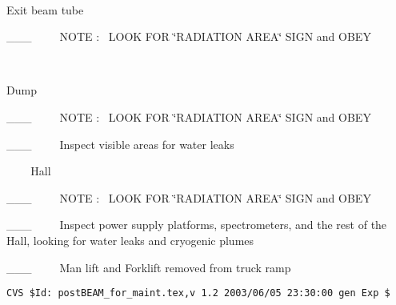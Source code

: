 ~

Exit beam tube

\_\_\_~~~~~NOTE :~ LOOK FOR \char`\"{}RADIATION AREA\char`\"{} SIGN and OBEY

~

Dump

\_\_\_~~~~~NOTE :~ LOOK FOR \char`\"{}RADIATION AREA\char`\"{} SIGN and OBEY

\_\_\_~~~~~Inspect visible areas for water leaks

~
~
~Hall 

\_\_\_~~~~~NOTE :~ LOOK FOR \char`\"{}RADIATION AREA\char`\"{} SIGN and OBEY

\_\_\_~~~~~Inspect power supply platforms, spectrometers, and the rest of the
Hall, looking for water leaks and cryogenic plumes

\_\_\_~~~~~Man lift and Forklift removed from truck ramp
%
%
{\small
\begin{verbatim}CVS $Id: postBEAM_for_maint.tex,v 1.2 2003/06/05 23:30:00 gen Exp $\end{verbatim}
}
